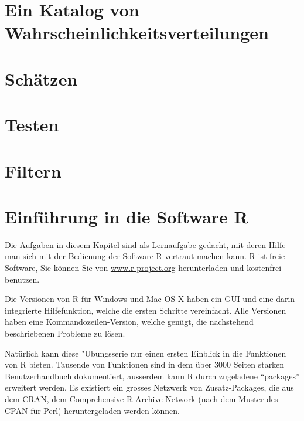 \documentclass[a4paper,12pt]{book}
\begin{document}
\chapter{Ein Katalog von Wahrscheinlichkeitsverteilungen}

\chapter{Schätzen}

\chapter{Testen}

\chapter{Filtern}

\chapter{Einführung in die Software R}
Die Aufgaben in diesem Kapitel sind als Lernaufgabe gedacht, mit deren
Hilfe man sich mit der Bedienung der Software R vertraut machen kann.
R ist freie Software, Sie können Sie von \url{www.r-project.org}
herunterladen und kostenfrei benutzen.

Die Versionen von R für Windows und Mac OS X haben ein GUI und eine darin
integrierte Hilfefunktion, welche die ersten Schritte vereinfacht. Alle
Versionen haben eine Kommandozeilen-Version, welche genügt, die nachstehend
beschriebenen Probleme zu lösen.

Natürlich kann diese "Ubungsserie nur einen ersten Einblick in die
Funktionen von R bieten. Tausende von Funktionen sind in dem über 3000
Seiten starken Benutzerhandbuch dokumentiert, ausserdem kann R durch
zugeladene ``packages'' erweitert werden. Es existiert ein grosses Netzwerk
von Zusatz-Packages, die aus dem CRAN, dem Comprehensive R Archive
Network (nach dem Muster des CPAN für Perl) heruntergeladen werden
können.

\bigskip


\end{document}
